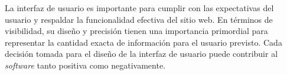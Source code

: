 

La interfaz de usuario es importante para cumplir con las expectativas del usuario y respaldar la funcionalidad efectiva del sitio web. En términos de visibilidad, su diseño y precisión tienen una importancia primordial para representar la cantidad exacta de información para el usuario previsto. Cada decisión tomada para el diseño de la interfaz de usuario puede contribuir al \textit{software} tanto positiva como negativamente.

